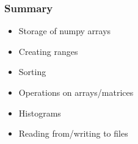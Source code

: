 \documentclass{beamer}
\begin{document}
\begin{frame}[fragile]
\frametitle{Summary}
\begin{itemize}
\item Storage of numpy arrays
\item Creating ranges
\item Sorting
\item Operations on arrays/matrices
\item Histograms
\item Reading from/writing to files
\end{itemize}
\end{frame}



\end{document}
